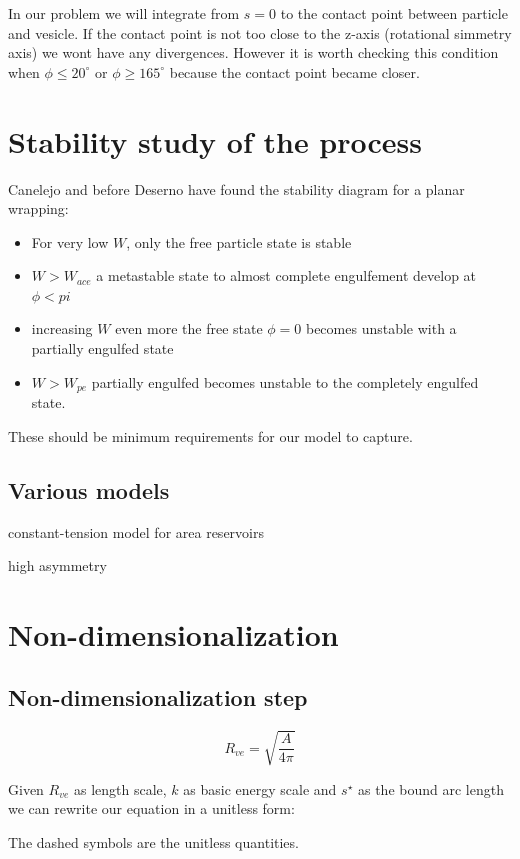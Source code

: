 \documentclass[12pt]{article}
\begin{document}
In our problem we will integrate from $s=0$ to the contact point between particle and vesicle. If the contact point is not too close to the z-axis (rotational simmetry axis) we wont have any divergences. However it is worth checking this condition when $\phi \leq 20^{\circ}$ or $\phi \geq 165^{\circ}$ because the contact point became closer.

\section{Stability study of the process}
Canelejo \cite{canalejoParticleEngulfmentStrongly2021a} and before Deserno \cite{desernoElasticDeformationFluid2004} have found the stability diagram for a planar wrapping:

\begin{itemize}
  \item For very low $W$, only the free particle state is stable
  \item $W > W_{ace}$ a metastable state to almost complete engulfement develop at $\phi<pi$
  \item increasing $W$ even more the free state $\phi=0$ becomes unstable with a partially engulfed state
  \item $W>W_{pe}$ partially engulfed becomes unstable to the completely engulfed state.
\end{itemize}

These should be minimum requirements for our model to capture.

\subsection{Various models}
constant-tension model for area reservoirs

high asymmetry



\section{Non-dimensionalization}
\subsection{Non-dimensionalization step}
$$
R_{ve} = \sqrt{\frac{A}{4 \pi}}
$$

Given $R_{ve}$ as length scale, $k$ as basic energy scale and $s^\star$ as the bound arc length we can rewrite our equation in a unitless form:

The dashed symbols are the unitless quantities.
\end{document}
